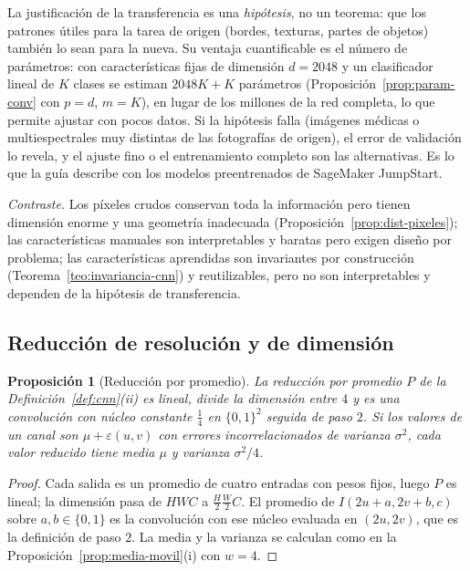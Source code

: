 \documentclass[11pt]{article}
\newtheorem{proposicion}[teorema]{Proposición}
\theoremstyle{definition}
\theoremstyle{remark}
\begin{document}
\noindent La justificación de la transferencia es una \emph{hipótesis}, no un teorema: que los patrones útiles para la tarea de origen (bordes, texturas, partes de objetos) también lo sean para la nueva. Su ventaja cuantificable es el número de parámetros: con características fijas de dimensión $d=2048$ y un clasificador lineal de $K$ clases se estiman $2048K+K$ parámetros (Proposición~\ref{prop:param-conv} con $p=d$, $m=K$), en lugar de los millones de la red completa, lo que permite ajustar con pocos datos. Si la hipótesis falla (imágenes médicas o multiespectrales muy distintas de las fotografías de origen), el error de validación lo revela, y el ajuste fino o el entrenamiento completo son las alternativas. Es lo que la guía describe con los modelos preentrenados de SageMaker JumpStart.

\medskip

\noindent \emph{Contraste.} Los píxeles crudos conservan toda la información pero tienen dimensión enorme y una geometría inadecuada (Proposición~\ref{prop:dist-pixeles}); las características manuales son interpretables y baratas pero exigen diseño por problema; las características aprendidas son invariantes por construcción (Teorema~\ref{teo:invariancia-cnn}) y reutilizables, pero no son interpretables y dependen de la hipótesis de transferencia.

\subsection{Reducción de resolución y de dimensión}\label{sec:resolucion}

\begin{proposicion}[Reducción por promedio]\label{prop:pool}
\noindent La reducción por promedio $P$ de la Definición~\ref{def:cnn}(ii) es lineal, divide la dimensión entre $4$ y es una convolución con núcleo constante $\frac14$ en $\{0,1\}^2$ seguida de paso $2$. Si los valores de un canal son $\mu+\varepsilon(u,v)$ con errores incorrelacionados de varianza $\sigma^2$, cada valor reducido tiene media $\mu$ y varianza $\sigma^2/4$.
\end{proposicion}
\begin{proof}
\noindent Cada salida es un promedio de cuatro entradas con pesos fijos, luego $P$ es lineal; la dimensión pasa de $HWC$ a $\frac H2\frac W2C$. El promedio de $I(2u+a,2v+b,c)$ sobre $a,b\in\{0,1\}$ es la convolución con ese núcleo evaluada en $(2u,2v)$, que es la definición de paso $2$. La media y la varianza se calculan como en la Proposición~\ref{prop:media-movil}(i) con $w=4$.
\end{proof}
\end{document}
